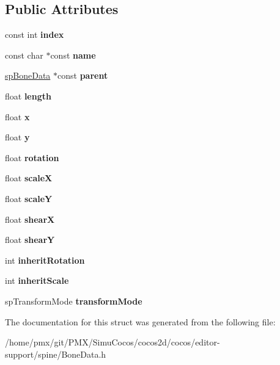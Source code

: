 \subsection*{Public Attributes}
\begin{DoxyCompactItemize}
\item 
\mbox{\label{structspBoneData_a648fc88a40e94d8bd7ba4cfabd915794}} 
const int {\bfseries index}
\item 
\mbox{\label{structspBoneData_aeaa3e8518a1fef69185f86613077bc13}} 
const char $\ast$const {\bfseries name}
\item 
\mbox{\label{structspBoneData_ae282aea0155e02caf37dcbddeb0b4e3f}} 
\hyperlink{structspBoneData}{sp\+Bone\+Data} $\ast$const {\bfseries parent}
\item 
\mbox{\label{structspBoneData_a94c7853ca1392f3fc755bad434a897c4}} 
float {\bfseries length}
\item 
\mbox{\label{structspBoneData_a5447ee5db5d89e09a06a6e1386822ee4}} 
float {\bfseries x}
\item 
\mbox{\label{structspBoneData_ae51f5d2ad84cc0815e3cb7fb5d2ff17b}} 
float {\bfseries y}
\item 
\mbox{\label{structspBoneData_ad437ebc76b0db48f03904ba4ad02afc7}} 
float {\bfseries rotation}
\item 
\mbox{\label{structspBoneData_af42aca2428f832b2fe45b9aa3c9db63b}} 
float {\bfseries scaleX}
\item 
\mbox{\label{structspBoneData_ab2b3f72a2cc944b7f25653bdf773713f}} 
float {\bfseries scaleY}
\item 
\mbox{\label{structspBoneData_a126dfc84599956f59e219308d8934eef}} 
float {\bfseries shearX}
\item 
\mbox{\label{structspBoneData_a90a0a5929c535d3ad410bb2b2a546be5}} 
float {\bfseries shearY}
\item 
\mbox{\label{structspBoneData_a27d7f8c7ceca954c576e98054a1c7713}} 
int {\bfseries inherit\+Rotation}
\item 
\mbox{\label{structspBoneData_a84492e58ebaef2c309d3d2d64b553f24}} 
int {\bfseries inherit\+Scale}
\item 
\mbox{\label{structspBoneData_aea557aeb4c23e4658b4542671bed23f1}} 
sp\+Transform\+Mode {\bfseries transform\+Mode}
\end{DoxyCompactItemize}


The documentation for this struct was generated from the following file\+:\begin{DoxyCompactItemize}
\item 
/home/pmx/git/\+P\+M\+X/\+Simu\+Cocos/cocos2d/cocos/editor-\/support/spine/Bone\+Data.\+h\end{DoxyCompactItemize}
